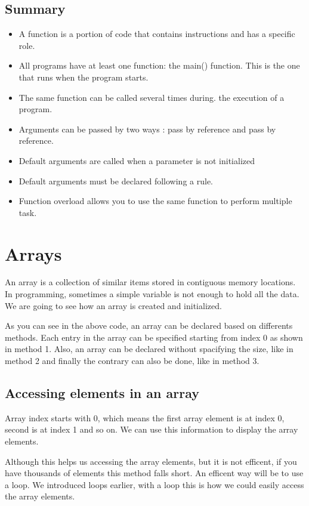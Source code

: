 \documentclass[11pt, a4paper]{article}
\begin{document}
\subsection{Summary}
\begin{itemize}
    \item A function is a portion of code that contains instructions
     and has a specific role.
    \item All programs have at least one function: the main() function.
     This is the one that runs when the program starts.
    \item The same function can be called several times during.
      the execution of a program.
    \item Arguments can be passed by two ways : pass by reference and pass by reference.
    \item Default arguments are called when a parameter is not initialized
    \item Default arguments must be declared following a rule.
    \item Function overload allows you to use the same function to perform multiple task.
\end{itemize}

\section{Arrays}
An array is a collection of similar items stored in contiguous memory locations.
In programming, sometimes a simple variable is not enough to hold all the data.
We are going to see how an array is created and initialized.

As you can see in the above code, an array can be declared based on differents methods.
Each entry in the array can be specified starting from index 0 as shown in method 1. Also,
an array can be declared without spacifying the size, like in method 2 and finally the contrary
can also be done, like in method 3.

\subsection{Accessing elements in an array}
Array index starts with 0, which means the first array element is at index 0,
second is at index 1 and so on. We can use this information to display the array elements.

Although this helps us accessing the array elements, but it is not efficent, if you have thousands of
elements this method falls short. An efficent way will be to use a loop. We introduced loops earlier,
with a loop this is how we could easily access the array elements.

\end{document}
